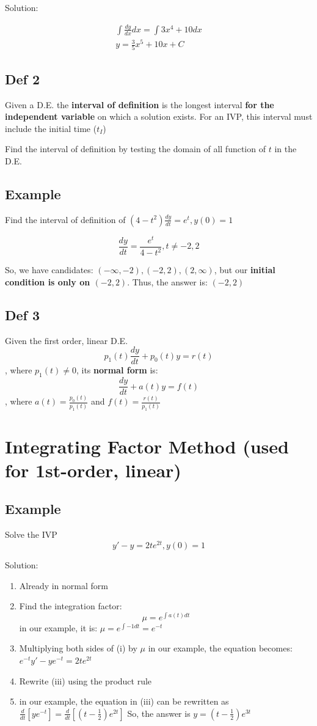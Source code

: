 \documentclass{article}
\begin{document}
Solution:

$$
\begin{aligned}
\int \frac{dy}{dx} dx = \int 3x^4 + 10 dx \\
y = \frac{3}{5}x^5 + 10x + C
\end{aligned}
$$

\subsection{Def 2}
Given a D.E. the \textbf{interval of definition} is the longest interval \textbf{for the independent variable} on which a solution exists. For an IVP, this interval must include the initial time ($t_I$)

Find the interval of definition by testing the domain of all function of $t$ in the D.E.

\subsection{Example}
Find the interval of definition of $(4 - t^2)\frac{dy}{dt} = e^t, y(0) = 1$

$$
\frac{dy}{dt} = \frac{e^t}{4 - t^2}, t \not = -2, 2
$$

So, we have candidates: $(-\infty, -2), (-2, 2), (2, \infty)$, but our \textbf{initial condition is only on $(-2, 2)$}. Thus, the answer is: $(-2, 2)$

\subsection{Def 3}
Given the first order, linear D.E. 
$$p_1(t)\frac{dy}{dt} + p_0(t)y = r(t)$$
, where $p_1(t) \not = 0$, its \textbf{normal form} is:
$$\frac{dy}{dt}+ a(t)y = f(t)$$
, where $a(t) = \frac{p_0(t)}{p_1(t)}$ and $f(t) = \frac{r(t)}{p_1(t)}$

\section{Integrating Factor Method (used for 1st-order, linear)}
\subsection{Example}
Solve the IVP
$$y' - y = 2te^{2t}, y(0) = 1$$

Solution:
\begin{enumerate}
    \item Already in normal form
    \item Find the integration factor:
        $$\mu = e^{\int a(t)dt}$$
        in our example, it is: $\mu = e^{\int -1 dt} = e^{-t}$
    \item Multiplying both sides of (i) by $\mu$
        in our example, the equation becomes: $e^{-t}y' - ye^{-t} = 2te^{2t}$
    \item Rewrite (iii) using the product rule
    \item in our example, the equation in (iii) can be rewritten as $\frac{d}{dt} [ye^{-t}] = \frac{d}{dt} [(t-\frac{1}{2})e^{2t}]$
    So, the answer is $y = (t - \frac{1}{2})e^{3t}$
\end{enumerate}
\end{document}
